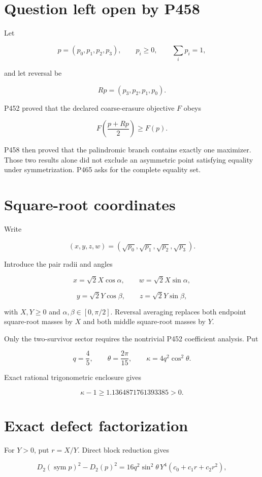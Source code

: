 \documentclass[11pt,a4paper,openany]{report}
\begin{document}
\section{Question left open by P458}

Let

\[
p=(p_0,p_1,p_2,p_3),\qquad p_i\ge0,\qquad\sum_i p_i=1,
\]

and let reversal be

\[
Rp=(p_3,p_2,p_1,p_0).
\]

P452 proved that the declared coarse-erasure objective \(F\) obeys

\[
F\!\left(\frac{p+Rp}{2}\right)\ge F(p).
\]

P458 then proved that the palindromic branch contains exactly one maximizer. Those two results alone did not exclude an asymmetric point satisfying equality under symmetrization. P465 asks for the complete equality set.

\section{Square-root coordinates}

Write

\[
(x,y,z,w)=(\sqrt{p_0},\sqrt{p_1},\sqrt{p_2},\sqrt{p_3}).
\]

Introduce the pair radii and angles

\[
x=\sqrt2X\cos\alpha,\qquad
w=\sqrt2X\sin\alpha,
\]

\[
y=\sqrt2Y\cos\beta,\qquad
z=\sqrt2Y\sin\beta,
\]

with \(X,Y\ge0\) and \(\alpha,\beta\in[0,\pi/2]\). Reversal averaging replaces both endpoint square-root masses by \(X\) and both middle square-root masses by \(Y\).

Only the two-survivor sector requires the nontrivial P452 coefficient analysis. Put

\[
q=\frac45,\qquad \theta=\frac{2\pi}{15},\qquad
\kappa=4q^2\cos^2\theta.
\]

Exact rational trigonometric enclosure gives

\[
\kappa-1\ge1.1364871761393385>0.
\]

\section{Exact defect factorization}

For \(Y>0\), put \(r=X/Y\). Direct block reduction gives

\[
D_2(\operatorname{sym}p)^2-D_2(p)^2
=16q^2\sin^2\theta\,Y^4
\left(c_0+c_1r+c_2r^2\right),
\]
\end{document}
